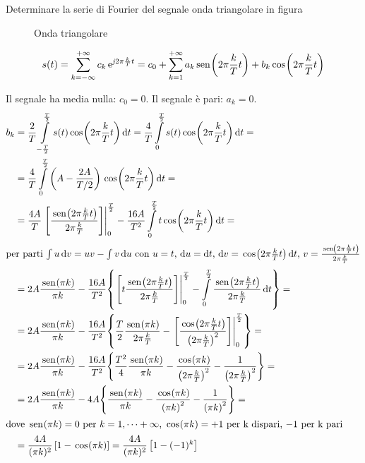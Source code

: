 \begin{esercizio}
Determinare la serie di Fourier del segnale onda triangolare in figura
\begin{figure}[!ht]
	\centering
	\caption{Onda triangolare}
	\label{fig:onda_triangolare}
\end{figure}

\[
	s(t)=\sum_{k=-\infty}^{+\infty}{c_k \operatorname{e}^{\operatorname{\mathit{j}\!} 2\pi\frac{k}{T}t}} =c_0+\sum_{k=1}^{+\infty}{a_k\,{\operatorname{sen}}^{}\!\left({2\pi\frac{k}{T}t}\right)+b_k\,{\operatorname{cos}}^{}\!\left({2\pi\frac{k}{T}t}\right)}
\]

Il segnale ha media nulla: $c_0=0$. Il segnale è pari: $a_k=0$.
\begin{align*}
	b_k&=\frac{2}{T}\intd{-\frac{T}{2}}{\frac{T}{2}}{s(t)\cos{2\pi\frac{k}{T}t}}{t}=\frac{4}{T}\intd{0}{\frac{T}{2}}{s(t)\cos{2\pi\frac{k}{T}t}}{t}=\\
	&=\frac{4}{T}\intd{0}{\frac{T}{2}}{\left(A-\frac{2 A}{T/2}\right)\cos{2\pi\frac{k}{T}t}}{t}=\\
	&=\frac{4A}{T}\bound{0}{\frac{T}{2}}{\frac{\sen{2\pi\frac{k}{T}t}}{2\pi\frac{k}{T}}} -\frac{16A}{T^2}\intd{0}{\frac{T}{2}}{t\cos{2\pi\frac{k}{T}t}}{t}=\\
	\intertext{per parti $\int u\diff v= u v-\int v\diff u$ con $u=t$, $\diff u=\diff t$, $\diff v=\cos{2\pi\frac{k}{T}t}\diff t$, $v=\frac{\sen{2\pi\frac{k}{T}t}}{2\pi\frac{k}{T}}$}
	&=2A \frac{\sen{\pi k}}{\pi k}-\frac{16A}{T^2}{\left\lbrace \bound{0}{\frac{T}{2}}{t\frac{\sen{2\pi\frac{k}{T}t}}{2\pi\frac{k}{T}}}-\intd{0}{\frac{T}{2}}{\frac{\sen{2\pi\frac{k}{T}t}}{2\pi\frac{k}{T}}}{t}\right\rbrace}=\\
	&=2A \frac{\sen{\pi k}}{\pi k}-\frac{16A}{T^2}{\left\lbrace\frac{T}{2}\frac{\sen{\pi k}}{2\pi\frac{k}{T}}-\bound{0}{\frac{T}{2}}{\frac{\cos{2\pi\frac{k}{T}t}}{\left(2\pi\frac{k}{T}\right)^2}}\right\rbrace}=\\
	&=2A \frac{\sen{\pi k}}{\pi k}-\frac{16A}{T^2}{\left\lbrace\frac{T^2}{4}\frac{\sen{\pi k}}{\pi k}-\frac{\cos{\pi k}}{\left(2\pi\frac{k}{T}\right)^2}-\frac{1}{\left(2\pi\frac{k}{T}\right)^2}\right\rbrace}=\\
	&=2A \frac{\sen{\pi k}}{\pi k}-4A{\left\lbrace\frac{\sen{\pi k}}{\pi k}-\frac{\cos{\pi k}}{\left(\pi k\right)^2}-\frac{1}{\left(\pi k\right)^2}\right\rbrace}=\\
	\intertext{dove $\sen{\pi k}=0$ per $k=1,\dots+\infty$, $\cos{\pi k}=+1$ per k dispari, $-1$ per k pari}
	&=\frac{4A}{(\pi k)^2}\left[1-\cos{\pi k}\right] = \frac{4A}{(\pi k)^2}\left[1-(-1)^k\right]
\end{align*}
\end{esercizio}

